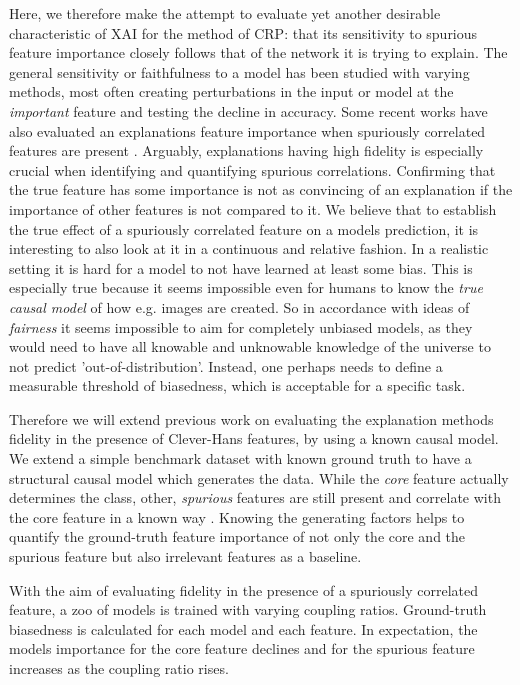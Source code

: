 Here, we therefore make the attempt to evaluate yet another desirable characteristic of XAI for the method of CRP: that its sensitivity to spurious feature importance closely follows that of the network it is trying to explain. The general sensitivity or faithfulness to a model has been studied with varying methods, most often creating perturbations in the input or model at the \textit{important} feature and testing the decline in accuracy. Some recent works have also evaluated an explanations feature importance when spuriously correlated features are present \cite{Yang2019,Kim2018,Parafita2019,Reimers2020,Singla2022}. Arguably, explanations having high fidelity is especially crucial when identifying and quantifying spurious correlations. Confirming that the true feature has some importance is not as convincing of an explanation if the importance of other features is not compared to it.
We believe that to establish the true effect of a spuriously correlated feature on a models prediction, it is interesting to also look at it in a continuous and relative fashion. 
In a realistic setting it is hard for a model to not have learned at least some bias. This is especially true because it seems impossible even for humans to know the \textit{true causal model} of how e.g. images are created. So in accordance with ideas of \textit{fairness} it seems impossible to aim for completely unbiased models, as they would need to have all knowable and unknowable knowledge of the universe to not predict 'out-of-distribution'. Instead, one perhaps needs to define a measurable threshold of biasedness, which is acceptable for a specific task.  

Therefore we will extend previous work on evaluating the explanation methods fidelity in the presence of Clever-Hans features, by using a known causal model. We extend a simple benchmark dataset with known ground truth to have a structural causal model which generates the data.
While the \textit{core} feature actually determines the class, other, \textit{spurious} features are still present and correlate with the core feature in a known way \cite{Singla2022}.
Knowing the generating factors helps to quantify the ground-truth feature importance of not only the core and the spurious feature but also irrelevant features as a baseline.

With the aim of evaluating fidelity in the presence of a spuriously correlated feature, a zoo of models is trained with varying coupling ratios. Ground-truth biasedness is calculated for each model and each feature. In expectation, the models importance for the core feature declines and for the spurious feature increases as the coupling ratio rises. 

